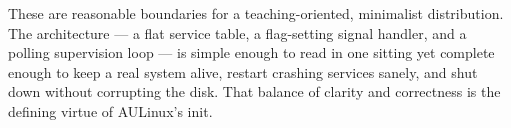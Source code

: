 These are reasonable boundaries for a teaching-oriented, minimalist
distribution. The architecture --- a flat service table, a flag-setting signal
handler, and a polling supervision loop --- is simple enough to read in one
sitting yet complete enough to keep a real system alive, restart crashing
services sanely, and shut down without corrupting the disk. That balance of
clarity and correctness is the defining virtue of AULinux's init.
